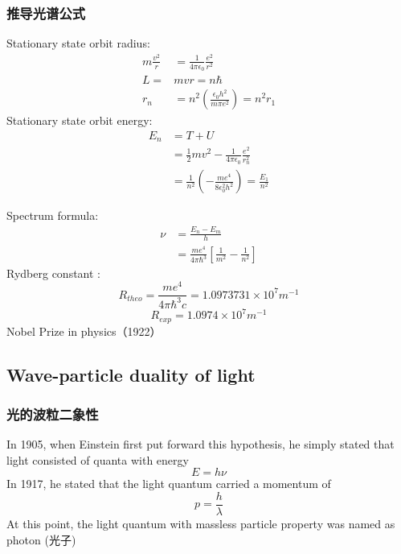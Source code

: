 \begin{frame}   
    \frametitle{推导光谱公式}
    \bullet Stationary state orbit radius:
    \begin{equation*}
        \begin{split}
            m\frac{v^2}{r}&=\frac{1}{4\pi\epsilon_0} \frac{e^2}{r^2} \\
            L=&mvr =n\hbar \\
            r_n&= n^2 (\frac{\epsilon_0 h^2}{m\pi e^2}) =n^2 r_1   
        \end{split} 
     \end{equation*}
     \bullet Stationary state orbit energy: 
     \begin{equation*}
        \begin{split}
            E_n &= T + U \\
            &= \frac{1}{2}mv^2- \frac{1}{4\pi\epsilon_0} \frac{e^2}{r_n ^2} \\
            &= \frac{1}{n^2} (-\frac{m e^4}{8 \epsilon_0 ^2 h^2}) = \frac{E_1}{n^2}
        \end{split}  
     \end{equation*}
\end{frame}

\begin{frame}
    \bullet Spectrum formula: 
    \begin{equation*}
        \begin{split}
         \nu&=\frac{E_n -E_m}{h} \\
         &= \frac{m e^4}{4\pi \hbar ^3} [\frac{1}{m^2} -\frac{1}{n^2}]
        \end{split}  
     \end{equation*}
     \bullet Rydberg constant : 
     \[R_{theo}= \frac{m e^4}{4\pi \hbar ^3 c} =1.0973731\times 10^7 m^{-1}\]
    \[R_{exp}=1.0974\times10^7 m^{-1} \]  
    {\color{deepred} Nobel Prize in physics（1922）}\\ 
\end{frame}

\subsection{Wave-particle duality of light}
\begin{frame} 
  \frametitle{光的波粒二象性}  
  \bullet In 1905, when Einstein first put forward this hypothesis, 
  he simply stated that light consisted of quanta with energy \[ E = hν \] 
  \bullet In 1917, he stated that the light quantum carried a momentum of  \[ p=\frac{h}{\lambda}\]
  At this point, the light quantum with massless particle property was named as photon (光子)
\end{frame}


